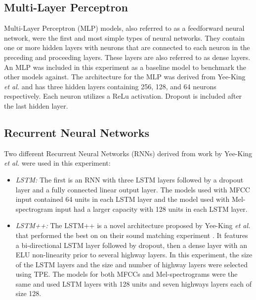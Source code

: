 
\subsection{Multi-Layer Perceptron}
Multi-Layer Perceptron (MLP) models, also referred to as a feedforward neural network, were the first and most simple types of neural networks. They contain one or more hidden layers with neurons that are connected to each neuron in the preceding and proceeding layers. These layers are also referred to as dense layers. An MLP was included in this experiment as a baseline model to benchmark the other models against. The architecture for the MLP was derived from Yee-King \textit{et al.} \cite{yee2018automatic} and has three hidden layers containing 256, 128, and 64 neurons respectively. Each neuron utilizes a ReLu activation. Dropout is included after the last hidden layer.

\subsection{Recurrent Neural Networks}
Two different Recurrent Neural Networks (RNNs) derived from work by Yee-King \textit{et al.} \cite{yee2018automatic} were used in this experiment:
\begin{itemize}
    \item \textit{LSTM:} The first is an RNN with three LSTM layers followed by a dropout layer and a fully connected linear output layer. The models used with MFCC input contained 64 units in each LSTM layer and the model used with Mel-spectrogram input had a larger capacity with 128 units in each LSTM layer.
    \item \textit{LSTM++:} The LSTM++ is a novel architecture proposed by Yee-King \textit{et al.} that performed the best on on their sound matching experiment \cite{yee2018automatic}. It features a bi-directional LSTM layer followed by dropout, then a dense layer with an ELU non-linearity prior to several highway layers. In this experiment, the size of the LSTM layers and the size and number of highway layers were selected using TPE. The models for both MFCCs and Mel-spectrograms were the same and used LSTM layers with 128 units and seven highways layers each of size 128.
\end{itemize}

